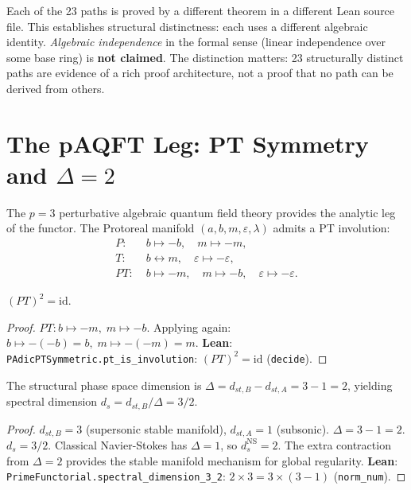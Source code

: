\begin{remark}
Each of the 23 paths is proved by a different theorem in a different Lean source file.  This establishes structural distinctness: each uses a different algebraic identity.  \emph{Algebraic independence} in the formal sense (linear independence over some base ring) is \textbf{not claimed}.  The distinction matters: 23 structurally distinct paths are evidence of a rich proof architecture, not a proof that no path can be derived from others.
\end{remark}


\section{The pAQFT Leg: PT Symmetry and $\Delta = 2$}
\label{sec:paqft}

The $p = 3$ perturbative algebraic quantum field theory provides the analytic leg of the functor.  The Protoreal manifold $(a, b, m, \varepsilon, \lambda)$ admits a PT involution:
\begin{align}
P: \;&b \mapsto -b, \quad m \mapsto -m, \\
T: \;&b \leftrightarrow m, \quad \varepsilon \mapsto -\varepsilon, \\
PT: \;&b \mapsto -m, \quad m \mapsto -b, \quad \varepsilon \mapsto -\varepsilon.
\end{align}

\begin{theorem}[PT is an involution]
$(PT)^2 = \mathrm{id}$.
\end{theorem}
\begin{proof}
$PT: b \mapsto -m, \; m \mapsto -b$.  Applying again: $b \mapsto -(-b) = b, \; m \mapsto -(-m) = m$.
\textbf{Lean}: \texttt{PAdicPTSymmetric.pt\_is\_involution}: $(PT)^2 = \mathrm{id}$ (\texttt{decide}).
\end{proof}

\begin{theorem}
The structural phase space dimension is $\Delta = d_{st,B} - d_{st,A} = 3 - 1 = 2$, yielding spectral dimension $d_s = d_{st,B}/\Delta = 3/2$.
\end{theorem}
\begin{proof}
$d_{st,B} = 3$ (supersonic stable manifold), $d_{st,A} = 1$ (subsonic).  $\Delta = 3 - 1 = 2$.  $d_s = 3/2$.  Classical Navier-Stokes has $\Delta = 1$, so $d_s^{\mathrm{NS}} = 2$.  The extra contraction from $\Delta = 2$ provides the stable manifold mechanism for global regularity.
\textbf{Lean}: \texttt{PrimeFunctorial.spectral\_dimension\_3\_2}: $2 \times 3 = 3 \times (3 - 1)$ (\texttt{norm\_num}).
\end{proof}

